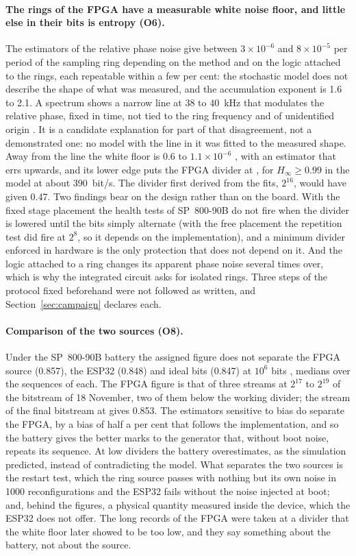 \paragraph{The rings of the FPGA have a measurable white noise floor, and
little else in their bits is entropy (O6).} The estimators of the
relative phase noise give between $3\times10^{-6}$ and $8\times10^{-5}$
per period of the sampling ring \meas{} depending on the method and on
the logic attached to the rings, each repeatable within a few per cent:
the stochastic model does not describe the shape of what was measured,
and the accumulation exponent is 1.6 to 2.1. A spectrum shows a narrow
line at 38 to 40~kHz that modulates the relative phase, fixed in time,
not tied to the ring frequency and of unidentified origin \meas{}. It is
a candidate explanation for part of that disagreement, not a
demonstrated one: no model with the line in it was fitted to the
measured shape. Away from the line the white floor is 0.6
to $1.1\times10^{-6}$ \meas{}, with an estimator that errs upwards, and
its lower edge puts the \ac{FPGA} divider at , for
$H_\infty \ge 0.99$ in the model at about 390~bit/s. The divider first
derived from the fits, $2^{16}$, would have given 0.47. Two findings bear
on the design rather than on the board. With the fixed stage placement
the health tests of SP~800-90B do not fire when the divider is lowered
until the bits simply alternate (with the free placement the repetition
test did fire at $2^{8}$, so it depends on the implementation), and a
minimum divider enforced in hardware is the only protection that does
not depend on it. And the logic attached to a ring changes its apparent phase noise
several times over, which is why the integrated circuit asks for
isolated rings. Three steps of the protocol fixed beforehand were not
followed as written, and Section~\ref{sec:campaign} declares each.

\paragraph{Comparison of the two sources (O8).} Under the SP~800-90B
battery the assigned figure does not separate the \ac{FPGA} source
(0.857), the ESP32 (0.848) and ideal bits (0.847) at $10^6$ bits
\meas{}, medians over the sequences of each. The \ac{FPGA} figure is
that of three streams at $2^{17}$ to $2^{19}$ of the bitstream of 18
November, two of them below the working divider; the stream of the
final bitstream at  gives 0.853. The estimators sensitive to bias do separate the \ac{FPGA}, by a
bias of half a per cent that follows the implementation, and so the
battery gives the better marks to the generator that, without boot
noise, repeats its sequence. At low dividers the battery overestimates,
as the simulation predicted, instead of contradicting the model. What
separates the two sources is the restart test, which the ring source
passes with nothing but its own noise in 1000 reconfigurations and the
ESP32 fails without the noise injected at boot; and, behind the figures,
a physical quantity measured inside the device, which the ESP32 does not
offer. The long records of the \ac{FPGA} were taken at a divider that
the white floor later showed to be too low, and they say something about
the battery, not about the source.


